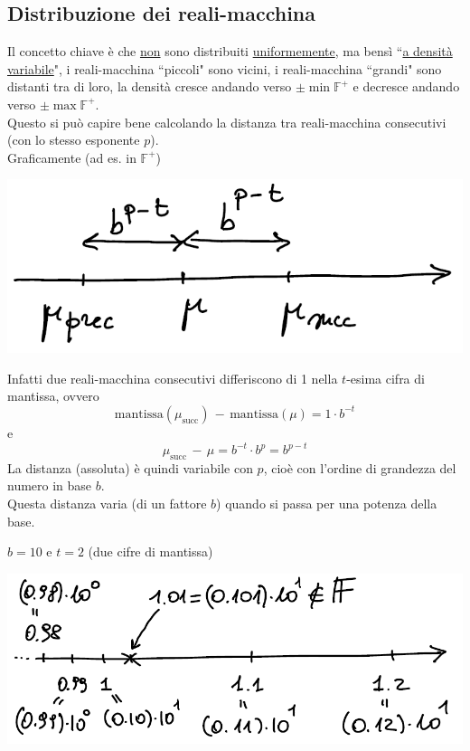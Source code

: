 \subsection{Distribuzione dei reali-macchina}
Il concetto chiave è che \uline{non} sono distribuiti \uline{uniformemente}, ma bensì ``\uline{a densità variabile}", i reali-macchina ``piccoli" sono vicini, i reali-macchina ``grandi" sono distanti tra di loro, la densità cresce andando verso $\pm \min \mathbb{F}^+$ e decresce andando verso $\pm \max \mathbb{F}^+$. \\
Questo si può capire bene calcolando la distanza tra reali-macchina consecutivi (con lo stesso esponente $p$).\\
Graficamente (ad es. in $\mathbb{F}^+$) 
\begin{center}
    \includegraphics[scale=0.65]{foto/img5}
\end{center}
Infatti due reali-macchina consecutivi differiscono di 1 nella $t$-esima cifra di mantissa, ovvero
\[ \text{mantissa}(\mu_{\text{succ}})\,-\,\text{mantissa}(\mu) = 1 \cdot b^{-t}\] e 
\[ \mu_{\text{succ}}\,-\,\mu = b^{-t} \cdot b^p = b^{p-t} \]
La distanza (assoluta) è quindi variabile con $p$, cioè con l'ordine di grandezza del numero in base $b$. \\
Questa distanza varia (di un fattore $b$) quando si passa per una potenza della base.
\begin{esempio}
$b = 10$ e $t = 2$ (due cifre di mantissa) 
\begin{center}
    \includegraphics[scale=0.65]{foto/img6}
\end{center}
\end{esempio}
